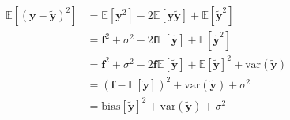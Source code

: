 \documentclass[twoside,11pt]{report}
\begin{document}
\begin{align*}
\mathbb{E}\left[(\mathbf{y}-\mathbf{\tilde{y}})^2\right] & = \mathbb{E}[\mathbf{y}^2] - 2\mathbb{E}[\mathbf{y\tilde{y}}] + \mathbb{E}[\mathbf{\tilde{y}}^2]\\
& = \mathbf{f}^2 + \sigma^2 - 2\mathbf{f}\mathbb{E}[\mathbf{\tilde{y}}] + \mathbb{E}[\mathbf{\tilde{y}}^2]\\
& = \mathbf{f}^2 + \sigma^2 - 2\mathbf{f}\mathbb{E}[\mathbf{\tilde{y}}] + \mathbb{E}[\mathbf{\tilde{y}}]^2 + \text{var}(\mathbf{\tilde{y}})\\
& = (\mathbf{f} - \mathbb{E}[\mathbf{\tilde{y}}])^2 + \text{var}(\mathbf{\tilde{y}}) + \sigma^2\\
& = \text{bias}[\mathbf{\tilde{y}}]^2 + \text{var}(\mathbf{\tilde{y}}) + \sigma^2
\end{align*}
\end{document}
